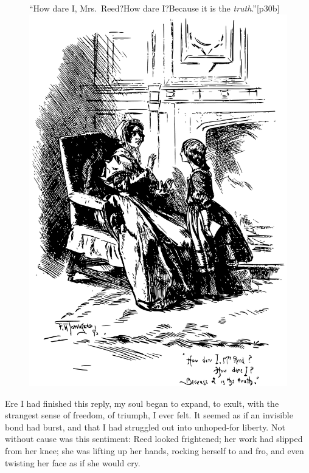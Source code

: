 \begin{figure}
	\begin{sidecaption}{\enquote{How dare I, Mrs.\ Reed?\linebreak How dare I?\linebreak Because it is the \emph{truth}.}}[p30b]
		\centering
		\includegraphics[width=\linewidth]{images/p30b.pdf}
	\end{sidecaption}
\end{figure}

Ere I had finished this reply, my soul began to expand, to exult, with
the strangest sense of freedom, of triumph, I ever felt. It seemed as
if an invisible bond had burst, and that I had struggled out into
unhoped-for liberty. Not without cause was this sentiment: \Mrs{} Reed
looked frightened; her work had slipped from her knee; she was lifting
up her hands, rocking herself to and fro, and even twisting her face as
if she would cry.

